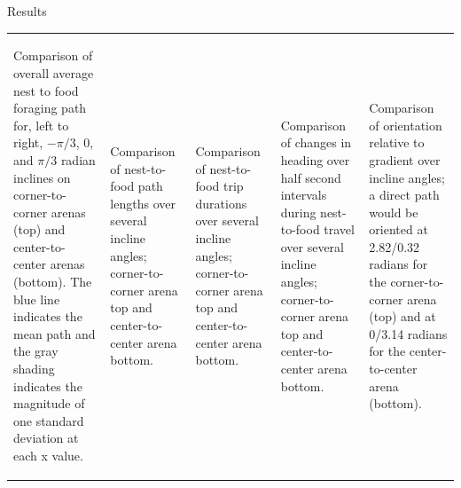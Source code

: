 \documentclass[final,table]{beamer}
\begin{document}
\begin{frame}[t]
\begin{block}{Results}
\begin{centering}
\begin{tabular}{p{} *{4}{|p{0.145\textwidth}}}
 \\
 \begin{spacing}{1.0}
 \footnotesize{
Comparison of overall average nest to food foraging path for, left to right, $-\pi/3$, $0$, and $\pi/3$ radian inclines on corner-to-corner arenas (top) and center-to-center arenas (bottom). The blue line indicates the mean path and the gray shading indicates the magnitude of one standard deviation at each x value.}
\end{spacing}
& 
\begin{spacing}{1.0}
\footnotesize{
Comparison of nest-to-food path lengths over several incline angles; corner-to-corner arena top and center-to-center arena bottom.
}
\end{spacing}
&
\begin{spacing}{1.0}
\footnotesize{
Comparison of nest-to-food trip durations over several incline angles; corner-to-corner arena top and center-to-center arena bottom.}
\end{spacing}
&
\begin{spacing}{1.0}
\footnotesize{
Comparison of changes in heading over half second intervals during nest-to-food travel over several incline angles; corner-to-corner arena top and center-to-center arena bottom.
}
\end{spacing}
& 
\begin{spacing}{1.0}
\footnotesize{
Comparison of orientation relative to gradient over incline angles; a direct path would be oriented at 2.82/0.32 radians for the corner-to-corner arena (top) and at 0/3.14 radians for the center-to-center arena (bottom).}
\end{spacing}
\end{tabular}
\end{centering}
\end{block}
   

    

\end{frame} %
\end{document}
